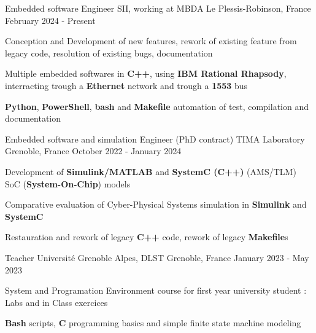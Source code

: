 

\begin{cventries}

	\cventry
	{Embedded software Engineer} %
	{SII, working at MBDA} %
	{Le Plessis-Robinson, France} %
	{February 2024 - Present} %
	{
		\begin{cvitems} %
		\item{Conception and Development of new features, rework of existing feature from legacy code, resolution of existing bugs, documentation}
		\item{Multiple embedded softwares in \textbf{C++}, using \textbf{IBM Rational Rhapsody}, interracting trough a \textbf{Ethernet} network and trough a \textbf{1553} bus}
		\item{\textbf{Python}, \textbf{PowerShell}, \textbf{bash} and \textbf{Makefile} automation of test, compilation and documentation}		
		\end{cvitems}
	}

	\cventry
	{Embedded software and simulation Engineer (PhD contract)} %
	{TIMA Laboratory} %
	{Grenoble, France} %
	{October 2022 - January 2024} %
	{
		\begin{cvitems} %
		\item{Development of \textbf{Simulink/MATLAB} and \textbf{SystemC (C++)} (AMS/TLM) SoC (\textbf{System-On-Chip}) models}
		\item{Comparative evaluation of Cyber-Physical Systems simulation in \textbf{Simulink} and \textbf{SystemC}}
		\item {Restauration and rework of legacy \textbf{C++} code, rework of legacy \textbf{Makefile}s}
		\end{cvitems}
	}

	\cventry
	{Teacher} %
	{Université Grenoble Alpes, DLST} %
	{Grenoble, France} %
	{January 2023 - May 2023} %
	{
		\begin{cvitems} %
		\item{System and Programation Environment course for first year university student : Labs and in Class exercices}
		\item{\textbf{Bash} scripts, \textbf{C} programming basics and simple finite state machine modeling}
		\end{cvitems}
	}


\end{cventries}
